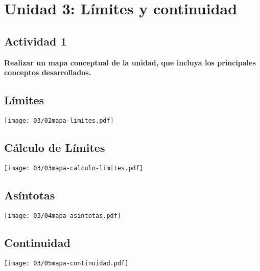 \section*{Unidad 3: Límites y continuidad}

\subsection*{Actividad 1}

\textbf{Realizar un mapa conceptual de la unidad, que incluya los
	principales conceptos desarrollados.}

\subsection*{Límites}
\begin{center}
	\texttt{[image: 03/02mapa-limites.pdf]}
\end{center}

\subsection*{Cálculo de Límites}
\begin{center}
	\texttt{[image: 03/03mapa-calculo-limites.pdf]}
\end{center}

\subsection*{Asíntotas}
\begin{center}
	\texttt{[image: 03/04mapa-asintotas.pdf]}
\end{center}

\subsection*{Continuidad}
\begin{center}
	\texttt{[image: 03/05mapa-continuidad.pdf]}
\end{center}
